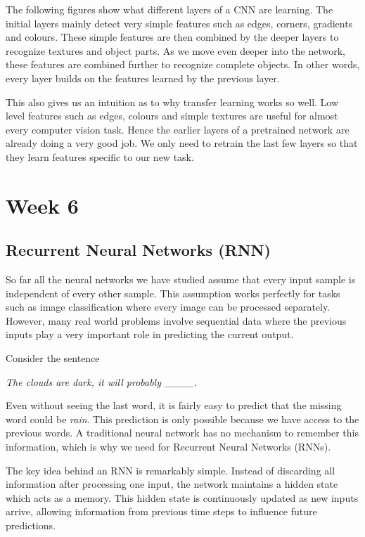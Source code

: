 \documentclass[12pt]{article}
\begin{document}
The following figures show what different layers of a CNN are learning. The initial layers mainly detect very simple features such as edges, corners, gradients and colours. These simple features are then combined by the deeper layers to recognize textures and object parts. As we move even deeper into the network, these features are combined further to recognize complete objects. In other words, every layer builds on the features learned by the previous layer.

This also gives us an intuition as to why transfer learning works so well. Low level features such as edges, colours and simple textures are useful for almost every computer vision task. Hence the earlier layers of a pretrained network are already doing a very good job. We only need to retrain the last few layers so that they learn features specific to our new task.
\section{Week 6}

\subsection{Recurrent Neural Networks (RNN)}

So far all the neural networks we have studied assume that every input sample is independent of every other sample. This assumption works perfectly for tasks such as image classification where every image can be processed separately. However, many real world problems involve sequential data where the previous inputs play a very important role in predicting the current output.

Consider the sentence

\begin{center}
\textit{The clouds are dark, it will probably \_\_\_\_.}
\end{center}

Even without seeing the last word, it is fairly easy to predict that the missing word could be \textit{rain}. This prediction is only possible because we have access to the previous words. A traditional neural network has no mechanism to remember this information, which is why we need for Recurrent Neural Networks (RNNs).

The key idea behind an RNN is remarkably simple. Instead of discarding all information after processing one input, the network maintains a hidden state which acts as a memory. This hidden state is continuously updated as new inputs arrive, allowing information from previous time steps to influence future predictions.
\end{document}
